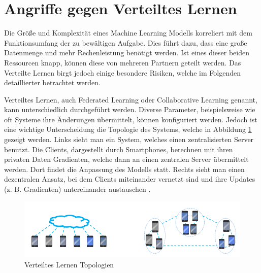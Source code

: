\section{Angriffe gegen Verteiltes Lernen}

Die Größe und Komplexität eines Machine Learning Modells korreliert mit dem Funktionsumfang der zu bewältigen Aufgabe.
Dies führt dazu, dass eine große Datenmenge und mehr Rechenleistung benötigt werden.
Ist eines dieser beiden Ressourcen knapp, können diese von mehreren Partnern geteilt werden.
Das Verteilte Lernen birgt jedoch einige besondere Risiken, welche im Folgenden detaillierter betrachtet werden.


Verteiltes Lernen, auch Federated Learning oder Collaborative Learning genannt, kann unterschiedlich durchgeführt werden. 
Diverse Parameter, beispielsweise wie oft Systeme ihre Änderungen übermittelt, können konfiguriert werden.
Jedoch ist eine wichtige Unterscheidung die Topologie des Systems, welche in Abbildung \ref{fig:federated_learning_topo} gezeigt werden.
Links sieht man ein System, welches einen zentralisierten Server benutzt. 
Die Clients, dargestellt durch Smartphones, berechnen mit ihren privaten Daten Gradienten, welche dann an einen zentralen Server übermittelt werden. 
Dort findet die Anpassung des Modells statt.
Rechts sieht man einen dezentralen Ansatz, bei dem Clients miteinander vernetzt sind und ihre Updates (z. B. Gradienten) untereinander austauschen \cite{P-89}. 

\begin{figure}[!htb]
    \centering
    \includegraphics[width=12cm]{figures/federated_learning}
    \caption{Verteiltes Lernen Topologien \cite{P-89}}
    \label{fig:federated_learning_topo}
\end{figure} 

